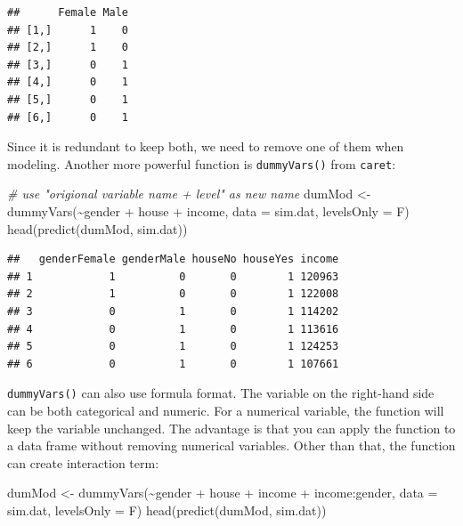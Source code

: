\documentclass[
  12pt,
]{krantz}
\makeatletter
\newenvironment{Shaded}{\begin{snugshade}}{\end{snugshade}}
\newcommand{\AttributeTok}[1]{\textcolor[rgb]{0.61,0.61,0.61}{#1}}
\newcommand{\CommentTok}[1]{\textcolor[rgb]{0.37,0.37,0.37}{\textit{#1}}}
\newcommand{\FunctionTok}[1]{\textcolor[rgb]{0,0,0}{#1}}
\newcommand{\NormalTok}[1]{#1}
\newcommand{\OtherTok}[1]{\textcolor[rgb]{0.37,0.37,0.37}{#1}}
\newcommand{\SpecialCharTok}[1]{\textcolor[rgb]{0,0,0}{#1}}
\newenvironment{kframe}{%
\medskip{}
\setlength{\fboxsep}{.8em}
 \def\at@end@of@kframe{}%
 \ifinner\ifhmode%
  \def\at@end@of@kframe{\end{minipage}}%
  \begin{minipage}{\columnwidth}%
 \fi\fi%
 \def\FrameCommand##1{\hskip\@totalleftmargin \hskip-\fboxsep
 \colorbox{shadecolor}{##1}\hskip-\fboxsep
     \hskip-\linewidth \hskip-\@totalleftmargin \hskip\columnwidth}%
 \MakeFramed {\advance\hsize-\width
   \@totalleftmargin\z@ \linewidth\hsize
   \@setminipage}}%
 {\par\unskip\endMakeFramed%
 \at@end@of@kframe}
\renewenvironment{Shaded}{\begin{kframe}}{\end{kframe}}
\makeatother
\begin{document}
\begin{verbatim}
##      Female Male
## [1,]      1    0
## [2,]      1    0
## [3,]      0    1
## [4,]      0    1
## [5,]      0    1
## [6,]      0    1
\end{verbatim}

Since it is redundant to keep both, we need to remove one of them when modeling. Another more powerful function is \texttt{dummyVars()} from \texttt{caret}:

\begin{Shaded}
\begin{Highlighting}[]
\CommentTok{\# use "origional variable name + level" as new name}
\NormalTok{dumMod }\OtherTok{\textless{}{-}} \FunctionTok{dummyVars}\NormalTok{(}\SpecialCharTok{\textasciitilde{}}\NormalTok{gender }\SpecialCharTok{+}\NormalTok{ house }\SpecialCharTok{+}\NormalTok{ income, }
                    \AttributeTok{data =}\NormalTok{ sim.dat, }
                    \AttributeTok{levelsOnly =}\NormalTok{ F)}
\FunctionTok{head}\NormalTok{(}\FunctionTok{predict}\NormalTok{(dumMod, sim.dat))}
\end{Highlighting}
\end{Shaded}

\begin{verbatim}
##   genderFemale genderMale houseNo houseYes income
## 1            1          0       0        1 120963
## 2            1          0       0        1 122008
## 3            0          1       0        1 114202
## 4            0          1       0        1 113616
## 5            0          1       0        1 124253
## 6            0          1       0        1 107661
\end{verbatim}

\texttt{dummyVars()} can also use formula format. The variable on the right-hand side can be both categorical and numeric. For a numerical variable, the function will keep the variable unchanged. The advantage is that you can apply the function to a data frame without removing numerical variables. Other than that, the function can create interaction term:

\begin{Shaded}
\begin{Highlighting}[]
\NormalTok{dumMod }\OtherTok{\textless{}{-}} \FunctionTok{dummyVars}\NormalTok{(}\SpecialCharTok{\textasciitilde{}}\NormalTok{gender }\SpecialCharTok{+}\NormalTok{ house }\SpecialCharTok{+}\NormalTok{ income }\SpecialCharTok{+}\NormalTok{ income}\SpecialCharTok{:}\NormalTok{gender, }
                    \AttributeTok{data =}\NormalTok{ sim.dat, }
                    \AttributeTok{levelsOnly =}\NormalTok{ F)}
\FunctionTok{head}\NormalTok{(}\FunctionTok{predict}\NormalTok{(dumMod, sim.dat))}
\end{Highlighting}
\end{Shaded}
\end{document}
